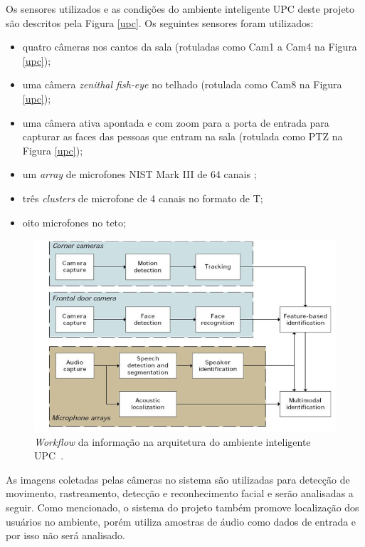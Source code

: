 Os sensores utilizados e as condições do ambiente inteligente UPC deste projeto são descritos pela Figura \ref{upc}. Os seguintes sensores foram utilizados:

	\begin{itemize}
		\item quatro câmeras nos cantos da sala (rotuladas como Cam1 a Cam4 na Figura \ref{upc});
		\item uma câmera \textit{zenithal fish-eye} no telhado (rotulada como Cam8 na Figura \ref{upc});
		\item uma câmera ativa apontada e com zoom para a porta de entrada para capturar as faces das pessoas que entram na sala (rotulada como PTZ na Figura \ref{upc});
		\item um \textit{array} de microfones NIST Mark III de 64 canais ;
		\item três \textit{clusters} de microfone de 4 canais no formato de T;
		\item oito microfones no teto;
	\end{itemize}


\begin{figure}[hbt]
		\begin{center}
			\includegraphics[scale=0.5]{figuras/3.TrabalhosCorrelatos/workflow.png}
		\end{center}
		\caption{\textit{Workflow} da informação na arquitetura do ambiente inteligente UPC~\cite{salah}.}
		\label{workflow}
	\end{figure}

As imagens coletadas pelas câmeras no sistema são utilizadas para detecção de movimento, rastreamento, detecção e reconhecimento facial e serão analisadas a seguir. Como mencionado, o sistema do projeto também promove localização dos usuários no ambiente, porém utiliza amostras de áudio como dados de entrada e por isso não será analisado.

